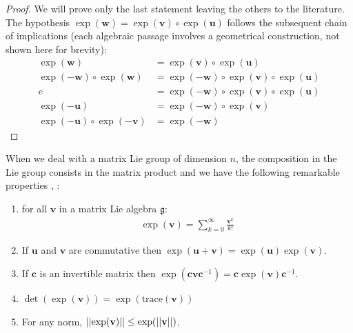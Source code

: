 \begin{proof}
	We will prove only the last statement leaving the others to the literature. The hypothesis $\exp(\mathbf{w}) = \exp(\mathbf{v}) \circ \exp(\mathbf{u})$ follows the subsequent chain of implications (each algebraic passage involves a geometrical construction, not shown here for brevity):
	\begin{align*}
		\exp(\mathbf{w}) &= \exp(\mathbf{v}) \circ \exp(\mathbf{u}) \\
		\exp(-\mathbf{w}) \circ \exp(\mathbf{w}) &= \exp(-\mathbf{w}) \circ\exp(\mathbf{v}) \circ \exp(\mathbf{u}) \\
		e &= \exp(-\mathbf{w}) \circ\exp(\mathbf{v}) \circ \exp(\mathbf{u}) \\
		\exp(-\mathbf{u})  &= \exp(-\mathbf{w}) \circ\exp(\mathbf{v})  \\
		\exp(-\mathbf{u}) \circ\exp(-\mathbf{v})  &= \exp(-\mathbf{w})  
	\end{align*}
\end{proof}

When we deal with a matrix Lie group of dimension $n$, the composition in the Lie group consists in the matrix product and we have the following remarkable properties \cite{hall2015lie}, \cite{kirillov2008introduction}:
\begin{enumerate}
	\item for all $\mathbf{v}$ in a matrix Lie algebra $\mathfrak{g}$:
	\begin{align}\label{eq:exp_as_inf_sum}
	\exp(\mathbf{v}) = \sum_{k=0}^{\infty} \frac{\mathbf{v}^{k}}{k!}
	\end{align}
	\item If $\mathbf{u}$ and $\mathbf{v}$ are commutative then $\exp(\mathbf{u} + \mathbf{v}) = \exp(\mathbf{u})\exp(\mathbf{v})$.
	\item If $\mathbf{c}$ is an invertible matrix then $\exp(\mathbf{c}\mathbf{v}\mathbf{c}^{-1}) = \mathbf{c}\exp(\mathbf{v})\mathbf{c}^{-1}$.
	\item $\det(\exp(\mathbf{v})) = \exp(\text{trace}(\mathbf{v}))$
	\item For any norm, $\vert\lvert \exp(\mathbf{v}) \rvert\vert \leq \exp(\vert\lvert \mathbf{v} \rvert\vert)$.
\end{enumerate}


